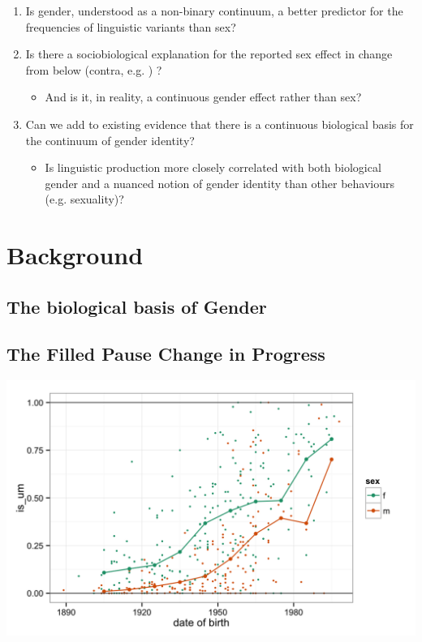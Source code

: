 \documentclass[a0,portrait]{a0poster}
\begin{document}
\begin{multicols}{2}
\begin{enumerate}
\item Is gender, understood as a non-binary continuum, a better predictor for the frequencies of linguistic variants than sex?
\item Is there a sociobiological explanation for the reported sex effect in change from below (contra, e.g. \citealt{labov2001, eckert2011}) ?
	\begin{itemize}
		\item And is it, in reality, a continuous gender effect rather than sex?
	\end{itemize}
\item Can we add to existing evidence that there is a continuous biological basis for the continuum of gender identity?
	\begin{itemize}
	\item Is linguistic production more closely correlated with both biological gender and a nuanced notion of gender identity than other behaviours (e.g. sexuality)?
	\end{itemize}


\end{enumerate}
\section*{Background}
\subsection{The biological basis of Gender}


\subsection{The Filled Pause Change in Progress}

\begin{center}\vspace{1cm}
\includegraphics[width=0.8\linewidth]{um.png}
\end{center}\vspace{1cm}


\end{multicols}
\end{document}
